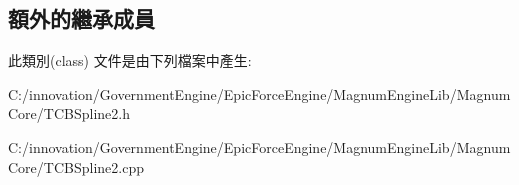 \subsection*{額外的繼承成員}


此類別(class) 文件是由下列檔案中產生\+:\begin{DoxyCompactItemize}
\item 
C\+:/innovation/\+Government\+Engine/\+Epic\+Force\+Engine/\+Magnum\+Engine\+Lib/\+Magnum\+Core/T\+C\+B\+Spline2.\+h\item 
C\+:/innovation/\+Government\+Engine/\+Epic\+Force\+Engine/\+Magnum\+Engine\+Lib/\+Magnum\+Core/T\+C\+B\+Spline2.\+cpp\end{DoxyCompactItemize}
